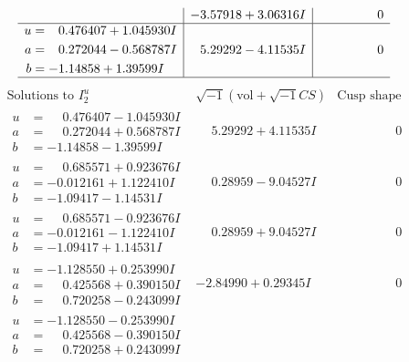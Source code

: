 \documentclass[1p]{elsarticle_modified}
\theoremstyle{definition}
\newcommand{\I}{\sqrt{-1}}
\begin{document}
$$\begin{array}{c|c|c}
 & -3.57918 + 3.06316 I & \phantom{-0.000000 } 0 \\ \hline\begin{aligned}
u &= \phantom{-}0.476407 + 1.045930 I \\
a &= \phantom{-}0.272044 - 0.568787 I \\
b &= -1.14858 + 1.39599 I\end{aligned}
 & \phantom{-}5.29292 - 4.11535 I & \phantom{-0.000000 } 0\\
 \hline 
 \end{array}$$\newpage$$\begin{array}{c|c|c}  
\text{Solutions to }I^u_{2}& \I (\text{vol} + \sqrt{-1}CS) & \text{Cusp shape}\\
 \hline 
\begin{aligned}
u &= \phantom{-}0.476407 - 1.045930 I \\
a &= \phantom{-}0.272044 + 0.568787 I \\
b &= -1.14858 - 1.39599 I\end{aligned}
 & \phantom{-}5.29292 + 4.11535 I & \phantom{-0.000000 } 0 \\ \hline\begin{aligned}
u &= \phantom{-}0.685571 + 0.923676 I \\
a &= -0.012161 + 1.122410 I \\
b &= -1.09417 - 1.14531 I\end{aligned}
 & \phantom{-}0.28959 - 9.04527 I & \phantom{-0.000000 } 0 \\ \hline\begin{aligned}
u &= \phantom{-}0.685571 - 0.923676 I \\
a &= -0.012161 - 1.122410 I \\
b &= -1.09417 + 1.14531 I\end{aligned}
 & \phantom{-}0.28959 + 9.04527 I & \phantom{-0.000000 } 0 \\ \hline\begin{aligned}
u &= -1.128550 + 0.253990 I \\
a &= \phantom{-}0.425568 + 0.390150 I \\
b &= \phantom{-}0.720258 - 0.243099 I\end{aligned}
 & -2.84990 + 0.29345 I & \phantom{-0.000000 } 0 \\ \hline\begin{aligned}
u &= -1.128550 - 0.253990 I \\
a &= \phantom{-}0.425568 - 0.390150 I \\
b &= \phantom{-}0.720258 + 0.243099 I\end{aligned}

\end{array}$$
\end{document}
